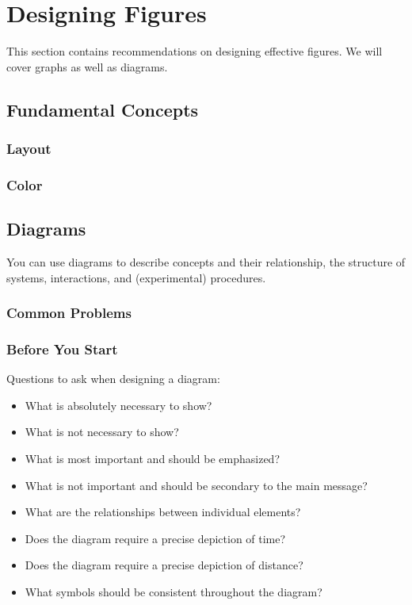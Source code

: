  
\chapter{Designing Figures}

This section contains recommendations on designing effective figures. We will cover graphs as well as diagrams.

\section{Fundamental Concepts}

\subsection{Layout}


% 

\subsection{Color}

\section{Diagrams}

You can use diagrams to describe concepts and their relationship, the structure of systems, interactions, and (experimental) procedures.

\subsection{Common Problems}



\subsection{Before You Start}

Questions to ask when designing a diagram:
\begin{itemize}
\item What is absolutely necessary to show?
\item What is not necessary to show?
\item What is most important and should be emphasized?
\item What is not important and should be secondary to the main message?
\item What are the relationships between individual elements?
\item Does the diagram require a precise depiction of time?
\item Does the diagram require a precise depiction of distance?
\item What symbols should be consistent throughout the diagram?
\end{itemize}

